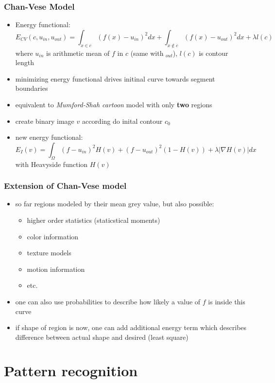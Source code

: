 \documentclass[11pt]{article}
\begin{document}
\subsubsection{Chan-Vese Model}
\label{sec-8-6-1}
\begin{itemize}
\item Energy functional:
\[ E_{CV}(c,u_{in}, u_{out}) = \int_{x\in c} (f(x)-u_{in})^2 dx +
         \int_{x \not \in c} (f(x)-u_{out})^2 dx + \lambda l(c) \]
where $u_{in}$ is arithmetic mean of $f$ in $c$ (same with $_{out}$),
$l(c)$ is contour length
\item minimizing energy functional drives initinal curve towards segment boundaries
\item equivalent to \emph{Mumford-Shah cartoon} model with only \textbf{two} regions
\item create binary image $v$ according do inital contour $c_0$
\item new energy functional:
\[ E_I(v) = \int_\Omega (f-u_{in})^2 H(v) + (f-u_{out})^2 (1-H(v)) +
         \lambda |\nabla H(v)| dx \]
with Heavyside function $H(v)$
\end{itemize}

\subsubsection{Extension of Chan-Vese model}
\label{sec-8-6-2}
\begin{itemize}
\item so far regions modeled by their mean grey value, but also possible:
\begin{itemize}
\item higher order statistics (staticstical moments)
\item color information
\item texture models
\item motion information
\item etc.
\end{itemize}
\item one can also use probabilities to describe how likely a value of $f$ is inside
this curve
\item if shape of region is now, one can add additional energy term which describes
difference between actual shape and desired (least square)
\end{itemize}

\section{Pattern recognition}
\label{sec-9}
\end{document}
